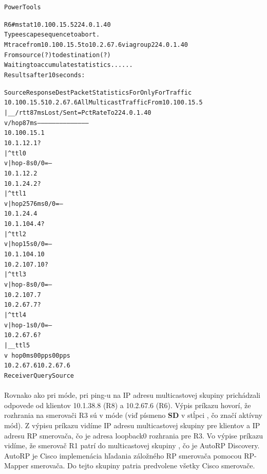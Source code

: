 \documentclass[12pt,twoside,a4paper]{report}
\begin{document}
\noindent
{\selectfont
\begin{small}
\begin{alltt}
Power Tools

R6#mstat 10.100.15.5 224.0.1.40
Type escape sequence to abort.
Mtrace from 10.100.15.5 to 10.2.67.6 via group 224.0.1.40
From source (?) to destination (?)
Waiting to accumulate statistics......
Results after 10 seconds:

  Source        Response Dest   Packet Statistics For     Only For Traffic
10.100.15.5     10.2.67.6       All Multicast Traffic     From 10.100.15.5
     |       __/  rtt 87   ms   Lost/Sent = Pct  Rate     To 224.0.1.40
     v      /     hop 87   ms   ---------------------     --------------------
10.100.15.1
10.1.12.1       ?
     |     ^      ttl   0
     v     |      hop -8   s     0/0 = --%
10.1.12.2
10.1.24.2       ?
     |     ^      ttl   1
     v     |      hop 2576 ms    0/0 = --%
10.1.24.4
10.1.104.4      ?
     |     ^      ttl   2
     v     |      hop 15   s     0/0 = --%
10.1.104.10
10.2.107.10     ?
     |     ^      ttl   3
     v     |      hop -8   s     0/0 = --%
10.2.107.7
10.2.67.7       ?
     |     ^      ttl   4
     v     |      hop -1   s     0/0 = --%
10.2.67.6       ?
     |      \__   ttl   5
     v         \  hop 0    ms        0         0 pps           0    0 pps
10.2.67.6       10.2.67.6
  Receiver      Query Source

\end{alltt}
\end{small}
}

\paragraph{}
Rovnako ako pri  móde, pri ping-u na IP adresu multicastovej skupiny prichádzali odpovede od klientov 10.1.38.8 (R8) a 10.2.67.6 (R6). Výpis príkazu  hovorí, že rozhrania na smerovači R3 sú v  móde (viď písmeno \textbf{SD} v stĺpci , čo značí aktívny  mód). Z výpisu príkazu  vidíme IP adresu multicastovej skupiny pre klientov a IP adresu RP smerovača, čo je adresa loopback0 rozhrania pre R3.  Vo výpise príkazu  vidíme, že smerovač R1 patrí do multicastovej skupiny , čo je AutoRP Discovery. AutoRP je Cisco implemenácia hľadania záložného RP smerovača pomocou RP-Mapper smerovača. Do tejto skupiny patria predvolene všetky Cisco smerovače.
\end{document}

